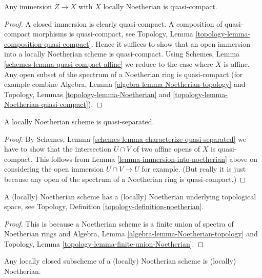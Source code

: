 \begin{lemma}
\label{lemma-immersion-into-noetherian}
Any immersion $Z \to X$ with $X$ locally Noetherian is quasi-compact.
\end{lemma}

\begin{proof}
A closed immersion is clearly quasi-compact.
A composition of quasi-compact morphisms is quasi-compact,
see Topology, Lemma \ref{topology-lemma-composition-quasi-compact}.
Hence it suffices to show that an open immersion into
a locally Noetherian scheme is quasi-compact.
Using Schemes, Lemma \ref{schemes-lemma-quasi-compact-affine}
we reduce to the case where $X$ is affine.
Any open subset of the spectrum of a Noetherian ring
is quasi-compact (for example
combine Algebra, Lemma \ref{algebra-lemma-Noetherian-topology} and
Topology, Lemmas \ref{topology-lemma-Noetherian} and
\ref{topology-lemma-Noetherian-quasi-compact}).
\end{proof}

\begin{lemma}
\label{lemma-locally-Noetherian-quasi-separated}
A locally Noetherian scheme is quasi-separated.
\end{lemma}

\begin{proof}
By Schemes, Lemma \ref{schemes-lemma-characterize-quasi-separated}
we have to show that the intersection $U \cap V$ of two
affine opens of $X$ is quasi-compact. This follows from
Lemma \ref{lemma-immersion-into-noetherian} above on
considering the open immersion $U \cap V \to U$ for example.
(But really it is just because any open of the spectrum of a
Noetherian ring is quasi-compact.)
\end{proof}

\begin{lemma}
\label{lemma-Noetherian-topology}
A (locally) Noetherian scheme has a (locally)
Noetherian underlying topological space,
see Topology, Definition \ref{topology-definition-noetherian}.
\end{lemma}

\begin{proof}
This is because a Noetherian scheme is a finite union of spectra
of Noetherian rings and
Algebra, Lemma \ref{algebra-lemma-Noetherian-topology} and
Topology, Lemma \ref{topology-lemma-finite-union-Noetherian}.
\end{proof}

\begin{lemma}
\label{lemma-locally-closed-in-Noetherian}
Any locally closed subscheme of a (locally) Noetherian
scheme is (locally) Noetherian.
\end{lemma}


